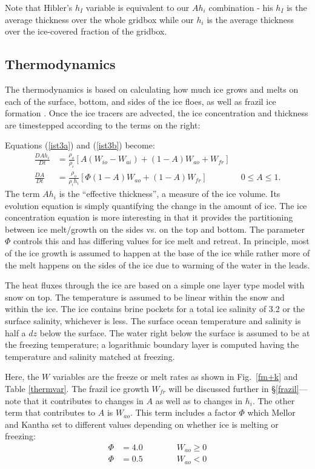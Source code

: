 Note that Hibler's $h_I$ variable is equivalent to our $A h_i$
combination - his $h_I$ is the average thickness over the whole
gridbox while our $h_i$ is the average thickness over the ice-covered
fraction of the gridbox. 

\subsection{Thermodynamics}
\label{Growth}

The thermodynamics is based on calculating how much ice grows and
melts on each of the surface, bottom, and sides of the ice floes,
as well as frazil ice formation \citep{Mellor89}.
Once the ice tracers are advected, the ice concentration and
thickness are timestepped according to the terms on the right:

Equations (\ref{ist3a}) and (\ref{ist3b}) become:
\begin{align}
  \frac{D A h_i }{D t}
  & = \frac{\rho_o }{ \rho_i} \left[ A (W_{io} - W_{ai}) + (1-A) W_{ao}
  + W_{fr} \right]
\label{ist4a} \\
  \frac{D A }{ D t}
  & = \frac{\rho_o}{ \rho_i h_i} \left[ \Phi (1-A) W_{ao} + (1-A)
  W_{fr} \right] \qquad \qquad 0 \leq A \leq 1 .
\label{ist4b}
\end{align}
The term $Ah_i$ is the ``effective thickness'', a measure of the ice
volume. Its evolution equation is simply quantifying the change in
the amount of ice. The ice concentration equation is more interesting in
that it provides the partitioning between ice melt/growth on the sides
vs. on the top and bottom. The parameter $\Phi$ controls this and has
differing values for ice melt and retreat. In principle, most of the ice
growth is assumed to happen at the base of the ice while rather more of
the melt happens on the sides of the ice due to warming of the water in
the leads.

The heat fluxes through the ice are based on a simple one layer
\citet{Semtner76a} type model with snow on top. The temperature is
assumed to be linear within the snow and within the ice. The ice contains
brine pockets for a total ice salinity of 3.2 or the surface salinity,
whichever is less. The surface ocean temperature and salinity is half a
$dz$ below the surface. The water right below the surface is assumed to
be at the freezing temperature; a logarithmic boundary layer is computed
having the temperature and salinity matched at freezing.

Here, the $W$ variables are the freeze or
melt rates as shown in Fig.\ \ref{fm+k} and Table \ref{thermvar}.  The
frazil ice growth $W_{fr}$ will be discussed further in
\S\ref{frazil}---note that it contributes to changes in $A$ as well as
to changes in $h_i$.  The other term that contributes to $A$ is
$W_{ao}$.  This term includes a factor $\Phi$ which Mellor and Kantha
set to different values depending on whether ice is melting or
freezing:
\begin{align}
    \Phi & = 4.0 \qquad\qquad W_{ao} \geq 0 \\
    \Phi & = 0.5 \qquad\qquad W_{ao} < 0
\end{align}


